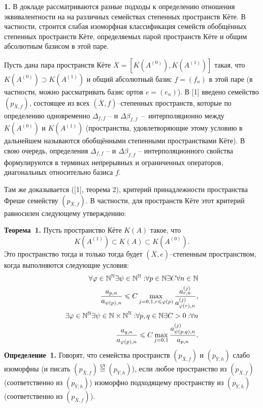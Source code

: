 \documentclass{vzmsthesis}
\begin{document}


\vzmscaption
{\bf 1. }В докладе рассматриваются разные подходы к определению отношения эквивалентности на на различных семействах степенных пространств Кёте. В частности, строится слабая изоморфная классификация семейств обобщённых степенных пространств Кёте,
определяемых парой пространств Кёте и общим абсолютным базисом в этой паре.

Пусть дана пара пространств Кёте  $\overline{X}=[K(A^{(0)}),K(A^{(1)})]$ такая, что
$K(A^{(0)})\supset K(A^{(1)})$ и общий абсолютный базис $f=(f_n)$ в этой паре (в частности, можно
рассматривать базис ортов $e=(e_n)$). В [1] введено семейство $(p_{\overline{X},f})$, состоящее из
всех $(\overline{X},f)$--степенных пространств, которые по определению одновременно $\Delta_{f,f}$ -- и
$\Delta\beta _{f,f}$~--~интерполяционно между $K(A^{(0)})$ и $K(A^{(1)})$ (пространства, удовлетворяющие
этому условию в дальнейшем называются обобщёнными степенными пространствами Кёте). В свою очередь,
определения $\Delta_{f,f}$ -- и $\Delta\beta _{f,f}$ -- интерполяционного свойства формулируются в
терминах непрерывных и ограниченных операторов, диагональных относительно базиса $f$.

Там же доказывается ([1], теорема 2), критерий принадлежности пространства Фреше семейству
$(p_{\overline{X},f})$. В частности, для пространств Кёте этот
критерий равносилен следующему утверждению:

\noindent\textbf{Теорема~1.}
Пусть пространство Кёте $K(A)$ такое, что 
$$K(A^{(1)})\subset K(A)\subset K(A^{(0)}).$$ Это пространство
тогда и только тогда будет $(\overline{X},e)$--степенным пространством, когда
выполняются следующие условия:
\begin{eqnarray*}
\forall{\varphi \in {\Bbb N}^{\Bbb N}}\exists{\psi \in {\Bbb N}^{\Bbb N}:}
\forall{p\in {\Bbb N}}\exists{C}\forall{n \in {\Bbb N}}\\
\dfrac{a_{p,n}}{a_{\psi(p),n}}\leqslant C
\max\limits_{j=0,1,r\leqslant \varphi(p)}
\dfrac{a^{(j)}_{r,n}}{a^{(j)}_{\varphi (r),n}}, \\
\exists{\varphi \in {\Bbb N}^{\Bbb N}}\exists{\psi \in {\Bbb N\times {\Bbb N}}^{\Bbb N}:}
\forall{p,q\in {\Bbb N}}\exists{C>0:}\forall{n}\\
\dfrac{a_{q,n}}{a_{\varphi (p),n}}\leqslant C
\max\limits_{j=0,1}
\dfrac{a^{(j)}_{\psi(p,q),n}}{a_{p,n}}.
\end{eqnarray*}
\noindent\textbf{Определение~1.}
Говорят, что семейства про\-странств $(p_{\overline{X},f})$ и $(p_{\overline{Y},h})$ слабо изоморфны
(и писать 
$(p_{\overline{X},f})\stackrel{\text{сл}}{\cong}(p_{\overline{Y},h})$), если любое пространство  из
$(p_{\overline{X},f})$ (соответственно из $(p_{\overline{Y},h})$) изоморфно подходящему пространству из
$(p_{\overline{Y},h})$ (соответственно из $(p_{\overline{X},f})$).
\end{document}
